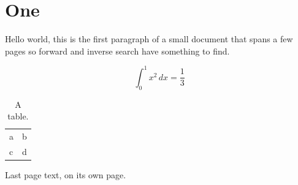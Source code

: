 \documentclass{article}
\begin{document}
\section{One}
Hello world, this is the first paragraph of a small
document that spans a few pages so forward and inverse
search have something to find.



\begin{equation}
  \int_0^1 x^2 \, dx = \frac{1}{3}
\end{equation}

\begin{table}[h]
\centering
\begin{tabular}{ll}
a & b \\
c & d \\
\end{tabular}
\caption{A table.}
\end{table}

\newpage
Last page text, on its own page.
\end{document}
